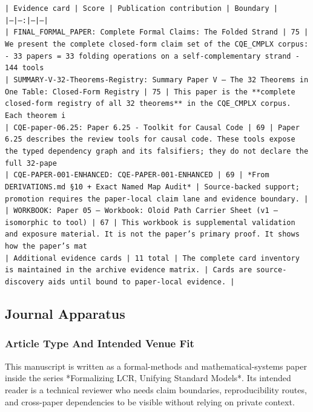 \documentclass[11pt]{article}
\begin{document}
\noindent\texttt{| Evidence card | Score | Publication contribution | Boundary |}\\
\noindent\texttt{|---|---:|---|---|}\\
\noindent\texttt{| FINAL\_FORMAL\_PAPER: Complete Formal Claims: The Folded Strand | 75 | We present the complete closed-form claim set of the CQE\_CMPLX corpus: - 33 papers = 33 folding operations on a self-complementary strand - 144 tools}\\
\noindent\texttt{| SUMMARY-V-32-Theorems-Registry: Summary Paper V — The 32 Theorems in One Table: Closed-Form Registry | 75 | This paper is the **complete closed-form registry of all 32 theorems** in the CQE\_CMPLX corpus. Each theorem i}\\
\noindent\texttt{| CQE-paper-06.25: Paper 6.25 - Toolkit for Causal Code | 69 | Paper 6.25 describes the review tools for causal code. These tools expose the typed dependency graph and its falsifiers; they do not declare the full 32-pape}\\
\noindent\texttt{| CQE-PAPER-001-ENHANCED: CQE-PAPER-001-ENHANCED | 69 | *From DERIVATIONS.md §10 + Exact Named Map Audit* | Source-backed support; promotion requires the paper-local claim lane and evidence boundary. |}\\
\noindent\texttt{| WORKBOOK: Paper 05 — Workbook: Oloid Path Carrier Sheet (v1 — isomorphic to tool) | 67 | This workbook is supplemental validation and exposure material. It is not the paper's primary proof. It shows how the paper's mat}\\
\noindent\texttt{| Additional evidence cards | 11 total | The complete card inventory is maintained in the archive evidence matrix. | Cards are source-discovery aids until bound to paper-local evidence. |}\\

\subsection*{Journal Apparatus}

\subsubsection*{Article Type And Intended Venue Fit}

This manuscript is written as a formal-methods and mathematical-systems paper
inside the series *Formalizing LCR, Unifying Standard Models*. Its intended
reader is a technical reviewer who needs claim boundaries, reproducibility
routes, and cross-paper dependencies to be visible without relying on private
context.
\end{document}
